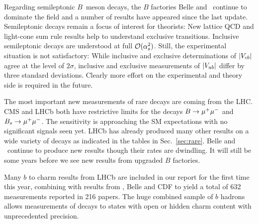 Regarding semileptonic $B$~meson decays, the $B$ factories Belle
and \babar\ continue to dominate the field and a number of results
have appeared since the last update. Semileptonic decays remain a
focus of interest for theorists: New lattice QCD and light-cone sum
rule results help to understand exclusive transitions. Inclusive
semileptonic decays are understood at full ${\cal
O}(\alpha^2_s)$. Still, the experimental situation is not satisfactory:
While inclusive and exclusive determinations of $|V_{cb}|$ agree at the
level of $2\sigma$, inclusive and exclusive measurements of $|V_{ub}|$
differ by three standard deviations. Clearly more effort on the
experimental and theory side is required in the future.

The most important new measurements of rare decays are coming from the
LHC.  CMS and LHCb both have restrictive limits for the decays
$B\to\mu^+\mu^-$ and $B_s\to\mu^+\mu^-$.  The sensitivity is approaching the SM
expectations with no significant signals seen yet.  LHCb has already
produced many other results on a wide variety of decays as indicated in 
the tables in Sec.~\ref{sec:rare}.  Belle and \babar\ continue to
produce new results though their rates are dwindling.  It will still
be some years before we see new results from upgraded $B$ factories.

Many $b$ to charm results from LHCb are included in our report for the  
first time this year, combining with
results from \babar, Belle and CDF to yield a total of 632  
measurements reported in 216 papers.
The huge combined sample of $b$ hadrons allows measurements of decays  
to states with open or hidden charm
content with unprecedented precision.

